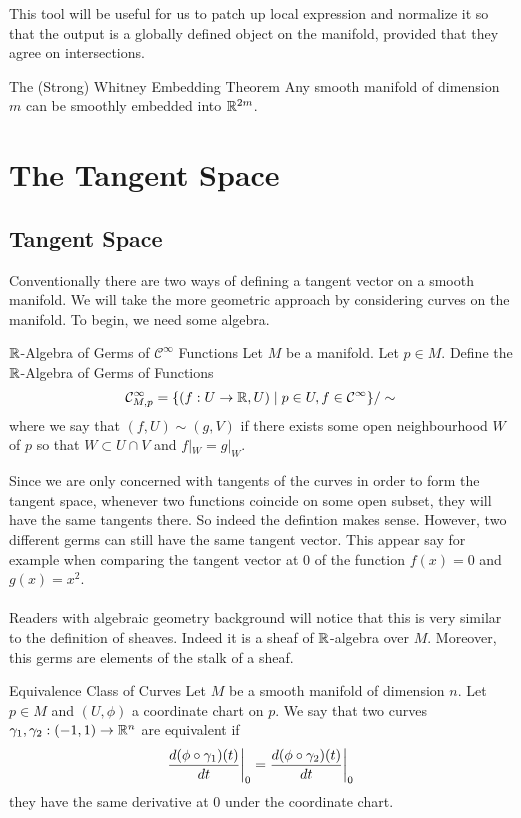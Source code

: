 \documentclass[a4paper]{article}
\begin{document}
This tool will be useful for us to patch up local expression and normalize it so that the output is a globally defined object on the manifold, provided that they agree on intersections. 

\begin{thm}{The (Strong) Whitney Embedding Theorem}{} Any smooth manifold of dimension $m$ can be smoothly embedded into $\mathbb{R}^{2m}$. 
\end{thm}

\pagebreak
\section{The Tangent Space}
\subsection{Tangent Space}
Conventionally there are two ways of defining a tangent vector on a smooth manifold. We will take the more geometric approach by considering curves on the manifold. To begin, we need some algebra. 

\begin{defn}{$\mathbb{R}$-Algebra of Germs of $\mathcal{C}^\infty$ Functions}{} Let $M$ be a manifold. Let $p\in M$. Define the $\mathbb{R}$-Algebra of Germs of Functions $$\mathcal{C}_{M,p}^\infty=\{(f:U\to\mathbb{R}, U)\;|\;p\in U, f\in\mathcal{C}^\infty\}/\sim$$ where we say that $(f,U)\sim(g,V)$ if there exists some open neighbourhood $W$ of $p$ so that $W\subset U\cap V$ and $f|_W=g|_W$. 
\end{defn}

Since we are only concerned with tangents of the curves in order to form the tangent space, whenever two functions coincide on some open subset, they will have the same tangents there. So indeed the defintion makes sense. However, two different germs can still have the same tangent vector. This appear say for example when comparing the tangent vector at $0$ of the function $f(x)=0$ and $g(x)=x^2$. \\~\\

Readers with algebraic geometry background will notice that this is very similar to the definition of sheaves. Indeed it is a sheaf of $\mathbb{R}$-algebra over $M$. Moreover, this germs are elements of the stalk of a sheaf. 

\begin{defn}{Equivalence Class of Curves}{} Let $M$ be a smooth manifold of dimension $n$. Let $p\in M$ and $(U,\phi)$ a coordinate chart on $p$. We say that two curves $\gamma_1,\gamma_2:(-1,1)\to\mathbb{R}^n$ are equivalent if $$\frac{d(\phi\circ\gamma_1)(t)}{dt}\bigg{|}_0=\frac{d(\phi\circ\gamma_2)(t)}{dt}\bigg{|}_0$$ they have the same derivative at $0$ under the coordinate chart. 
\end{defn}
\end{document}
